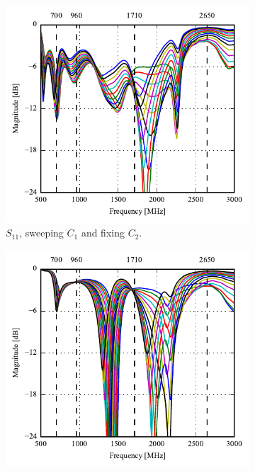 \begin{figure}[htbp]
   \begin{subfigure}[b]{0.49\linewidth}
        \centering
        \includegraphics{img/tech_sol/monopole/read_mode/s11}
        \caption{$S_{11}$, sweeping $C_1$ and fixing $C_2$.}
    \end{subfigure}
    \hfill
    \begin{subfigure}[b]{0.49\linewidth}
        \centering
        \includegraphics{img/tech_sol/monopole/read_mode/s22}

\end{subfigure}
\end{figure}
